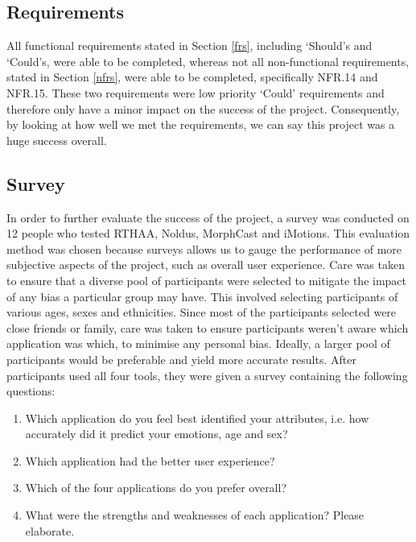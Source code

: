 \documentclass[12pt, a4paper]{article}
\begin{document}
\subsection{Requirements}

All functional requirements stated in Section \ref{frs}, including `Should's and `Could's, were able to be completed, whereas not all non-functional requirements, stated in Section \ref{nfrs}, were able to be completed, specifically NFR.14 and NFR.15. These two requirements were low priority `Could' requirements and therefore only have a minor impact on the success of the project. Consequently, by looking at how well we met the requirements, we can say this project was a huge success overall.

\subsection{Survey}

In order to further evaluate the success of the project, a survey was conducted on 12 people who tested RTHAA, Noldus, MorphCast and iMotions. This evaluation method was chosen because surveys allows us to gauge the performance of more subjective aspects of the project, such as overall user experience. Care was taken to ensure that a diverse pool of participants were selected to mitigate the impact of any bias a particular group may have. This involved selecting participants of various ages, sexes and ethnicities. Since most of the participants selected were close friends or family, care was taken to ensure participants weren't aware which application was which, to minimise any personal bias. Ideally, a larger pool of participants would be preferable and yield more accurate results. After participants used all four tools, they were given a survey containing the following questions:

\begin{enumerate}
    \item Which application do you feel best identified your attributes, i.e. how accurately did it predict your emotions, age and sex?

    \item Which application had the better user experience?    
    
    \item Which of the four applications do you prefer overall?

    \item What were the strengths and weaknesses of each application? Please elaborate.
\end{enumerate}
\end{document}

